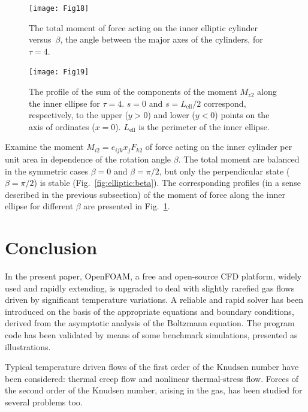 \documentclass[smallextended, referee]{svjour3} %
\begin{document}
\begin{figure}[ht]
    \centering
    \begin{minipage}{.48\textwidth}
        \centering
        \texttt{[image: Fig18]}
        \caption{The total moment of force acting on the inner elliptic cylinder
                versus~\(\beta\), the angle between the major axes of the cylinders,
                for \(\tau=4\).}
        \label{fig:elliptic:beta}
    \end{minipage}
    \quad
    \begin{minipage}{.48\textwidth}
        \centering
        \texttt{[image: Fig19]}
        \caption{The profile of the sum of the components of the moment \(M_{z2}\)
                along the inner ellipse for \(\tau=4\).
                \(s=0\) and \(s=L_\mathrm{ell}/2\) correspond, respectively,
                to the upper (\(y>0\)) and lower (\(y<0\)) points on the axis of ordinates (\(x=0\)).
                \(L_\mathrm{ell}\) is the perimeter of the inner ellipse.}
        \label{fig:elliptic:profiles}
    \end{minipage}
\end{figure}

Examine the moment \(M_{i2} = e_{ijk}x_jF_{k2}\) of force acting on the inner cylinder
per unit area in dependence of the rotation angle \(\beta\).
The total moment are balanced in the symmetric cases \(\beta=0\) and \(\beta=\pi/2\),
but only the perpendicular state (\(\beta=\pi/2\)) is stable (Fig.~\ref{fig:elliptic:beta}).
The corresponding profiles (in a sense described in the previous subsection)
of the moment of force along the inner ellipse for different \(\beta\)
are presented in Fig.~\ref{fig:elliptic:profiles}.

\section{Conclusion}

In the present paper, OpenFOAM\textregistered{}, a free and open-source CFD platform,
widely used and rapidly extending, is upgraded to deal with
slightly rarefied gas flows driven by significant temperature variations.
A reliable and rapid solver has been introduced on the basis of the appropriate
equations and boundary conditions, derived from the asymptotic analysis of the Boltzmann equation.
The program code has been validated by means of some benchmark simulations,
presented as illustrations.

Typical temperature driven flows of the first order of the Knudsen number have been considered:
thermal creep flow and nonlinear thermal-stress flow.
Forces of the second order of the Knudsen number, arising in the gas,
has been studied for several problems too.
\end{document}
